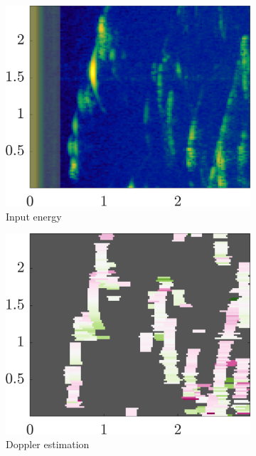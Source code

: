 \begin{figure}
    \begin{subfigure}[b]{0.25\textwidth}
        \centering
        \includegraphics[width=.9\textwidth]{gfx/results/attic_input.png}
        \caption{\small Input energy}
    \end{subfigure}%
    \begin{subfigure}[b]{0.25\textwidth}  
        \centering 
        \includegraphics[width=.9\textwidth]{gfx/results/attic_doppler.png}
        \caption{\small Doppler estimation}
    \end{subfigure}%
    \begin{subfigure}[b]{0.25\textwidth}   
        \centering 

\end{subfigure}
\end{figure}
